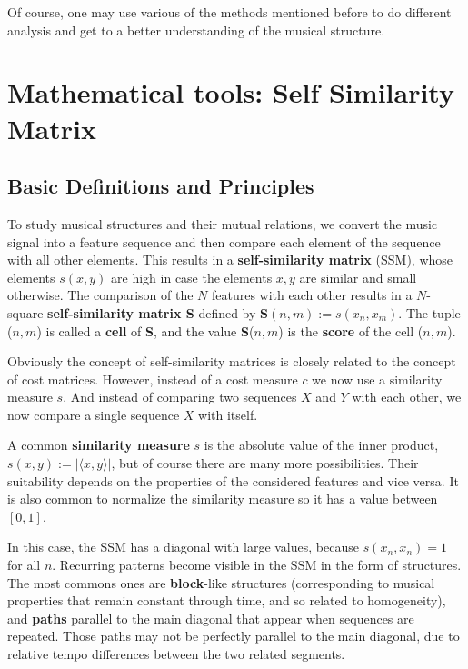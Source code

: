 \documentclass[a4paper, 9pt, twocolumn]{extarticle}
\begin{document}
Of course, one may use various of the methods mentioned before to do different analysis and get to a better understanding of the musical structure.

\section{Mathematical tools: Self Similarity Matrix}
\label{section:ssm}
\subsection{Basic Definitions and Principles}
\label{subsection:ssmBasic}

To study musical structures and their mutual relations, we convert the music signal into a feature sequence and then compare each element of the sequence with all other elements. This results in a \textbf{self-similarity matrix} (SSM), whose elements $s(x,y)$ are high in case the elements $x,y$ are similar and small otherwise. The comparison of the $N$ features with each other results in a $N$-square \textbf{self-similarity matrix S} defined by $\textbf{S}(n,m):=s(x_{n}, x_{m})$. The tuple ($n,m$) is called a \textbf{cell} of \textbf{S}, and the value \textbf{S}($n,m$) is the \textbf{score} of the cell ($n,m$).

Obviously the concept of self-similarity matrices is closely related to the concept of cost matrices. However, instead of a cost measure $c$ we now use a similarity measure $s$. And
instead of comparing two sequences $X$ and $Y$ with each other, we now compare a single sequence $X$ with itself.

A common \textbf{similarity measure} $s$ is the absolute value of the inner product, $s(x,y):=|\langle x,y \rangle|$, but of course there are many more possibilities. Their suitability depends on the properties of the considered features and vice versa. It is also common to normalize the similarity measure so it has a value between $[0,1]$. 

In this case, the SSM has a diagonal with large values, because $s(x_{n},x_{n})=1$ for all $n$. Recurring patterns become visible in the SSM in the form of structures. The most commons ones are \textbf{block}-like structures (corresponding to musical properties that remain constant through time, and so related to homogeneity), and \textbf{paths} parallel to the main diagonal that appear when  sequences are repeated. Those paths may not be perfectly parallel to the main diagonal, due to relative tempo differences between the two related segments.
\end{document}
